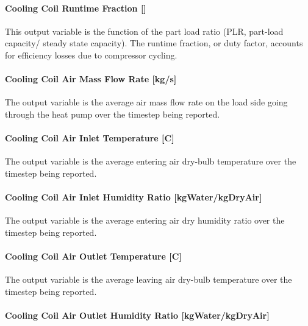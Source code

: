 \paragraph{Cooling Coil Runtime Fraction {[]}}\label{cooling-coil-runtime-fraction-3}

This output variable is the function of the part load ratio (PLR, part-load capacity/ steady state capacity). The runtime fraction, or duty factor, accounts for efficiency losses due to compressor cycling.

\paragraph{Cooling Coil Air Mass Flow Rate {[}kg/s{]}}\label{cooling-coil-air-mass-flow-rate-kgs}

The output variable is the average air mass flow rate on the load side going through the heat pump over the timestep being reported.

\paragraph{Cooling Coil Air Inlet Temperature {[}C{]}}\label{cooling-coil-air-inlet-temperature-c}

The output variable is the average entering air dry-bulb temperature over the timestep being reported.

\paragraph{Cooling Coil Air Inlet Humidity Ratio {[}kgWater/kgDryAir{]}}\label{cooling-coil-air-inlet-humidity-ratio-kgwaterkgdryair}

The output variable is the average entering air dry humidity ratio over the timestep being reported.

\paragraph{Cooling Coil Air Outlet Temperature {[}C{]}}\label{cooling-coil-air-outlet-temperature-c}

The output variable is the average leaving air dry-bulb temperature over the timestep being reported.

\paragraph{Cooling Coil Air Outlet Humidity Ratio {[}kgWater/kgDryAir{]}}\label{cooling-coil-air-outlet-humidity-ratio-kgwaterkgdryair}

